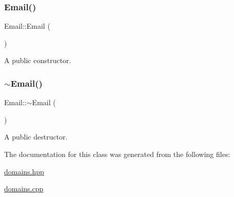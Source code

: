 \subsubsection{\texorpdfstring{Email()}{Email()}}
{\footnotesize\ttfamily Email\+::\+Email (\begin{DoxyParamCaption}{ }\end{DoxyParamCaption})}

A public constructor. \mbox{\label{class_email_a3e56bac4e1d6170fb5ba3ece6efb89a3}} 
\subsubsection{\texorpdfstring{$\sim$\+Email()}{~Email()}}
{\footnotesize\ttfamily Email\+::$\sim$\+Email (\begin{DoxyParamCaption}{ }\end{DoxyParamCaption})}

A public destructor. 

The documentation for this class was generated from the following files\+:\begin{DoxyCompactItemize}
\item 
\hyperlink{domains_8hpp}{domains.\+hpp}\item 
\hyperlink{domains_8cpp}{domains.\+cpp}\end{DoxyCompactItemize}

